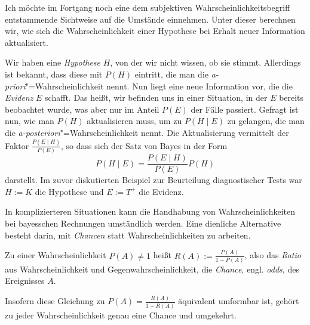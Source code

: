 Ich möchte im Fortgang noch eine dem subjektiven Wahrscheinlichkeitsbegriff
entstammende Sichtweise auf die Umstände einnehmen. Unter dieser berechnen
wir, wie sich die Wahrscheinlichkeit einer Hypothese bei Erhalt neuer
Information aktualisiert.

Wir haben eine \emph{Hypothese} $H$, von der wir nicht wissen, ob sie
stimmt. Allerdings ist bekannt, dass diese mit $P(H)$ eintritt, die man
die \emph{a-priori}"=Wahrscheinlichkeit nennt. Nun liegt eine neue
Information vor, die die \emph{Evidenz} $E$ schafft. Das heißt,
wir befinden uns in einer Situation, in der $E$ bereits beobachtet wurde,
was aber nur im Anteil $P(E)$ der Fälle passiert. Gefragt ist nun,
wie man $P(H)$ aktualisieren muss, um zu $P(H\mid E)$ zu gelangen,
die man die \emph{a-posteriori}"=Wahrscheinlichkeit nennt. Die
Aktualisierung vermittelt der Faktor $\frac{P(E\mid H)}{P(E)}$, so
dass sich der Satz von Bayes in der Form
\[P(H\mid E) = \frac{P(E\mid H)}{P(E)}P(H)\]
darstellt. Im zuvor diskutierten Beispiel zur Beurteilung diagnostischer
Tests war $H:=K$ die Hypothese und $E:=T^+$ die Evidenz.

In komplizierteren Situationen kann die Handhabung von Wahrscheinlichkeiten
bei bayesschen Rechnungen umständlich werden. Eine dienliche Alternative
besteht darin, mit \emph{Chancen} statt Wahrscheinlichkeiten zu arbeiten.

\begin{Definition}[Chance]\newlinefirst
Zu einer Wahrscheinlichkeit $P(A)\ne 1$ heißt $R(A):=\frac{P(A)}{1-P(A)}$,
also das \emph{Ratio} aus Wahrscheinlichkeit und Gegenwahrscheinlichkeit,
die \emph{Chance}, engl. \emph{odds}, des Ereignisses $A$.
\end{Definition}

\noindent
Insofern diese Gleichung zu $P(A)=\frac{R(A)}{1+R(A)}$ äquivalent umformbar
ist, gehört zu jeder Wahrscheinlichkeit genau eine Chance und umgekehrt.

